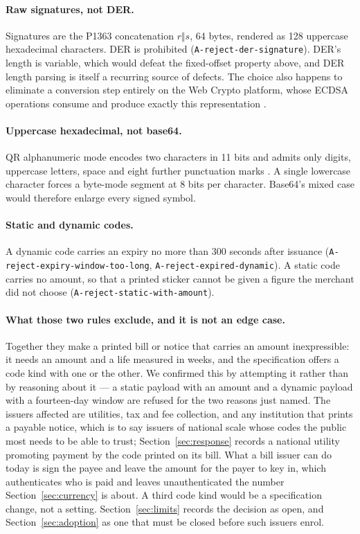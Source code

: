 \documentclass[10pt,a4paper,twocolumn]{article}
\newcommand{\code}[1]{\texttt{\small #1}}
\begin{document}
\paragraph{Raw signatures, not DER.}
Signatures are the P1363 concatenation $r \Vert s$, 64 bytes, rendered as 128
uppercase hexadecimal characters. DER is prohibited (\code{A-reject-\allowbreak der-\allowbreak signature}). DER's length is variable,
which would defeat the fixed-offset property above, and DER length parsing is
itself a recurring source of defects. The choice also happens to eliminate a
conversion step entirely on the Web Crypto platform, whose ECDSA operations
consume and produce exactly this representation \citep{webcrypto,fips1865}.

\paragraph{Uppercase hexadecimal, not base64.}
QR alphanumeric mode encodes two characters in 11 bits and admits only digits,
uppercase letters, space and eight further punctuation marks
\citep{iso18004}. A single lowercase character forces a byte-mode segment at 8
bits per character. Base64's mixed case would therefore enlarge every signed
symbol.

\paragraph{Static and dynamic codes.}
A dynamic code carries an expiry no more than 300 seconds after issuance
(\code{A-reject-\allowbreak expiry-\allowbreak window-\allowbreak too-\allowbreak long},
\code{A-reject-\allowbreak expired-\allowbreak dynamic}). A static code carries no
amount, so that a printed sticker cannot be given a figure the merchant did not
choose (\code{A-reject-\allowbreak static-\allowbreak with-\allowbreak amount}).

\paragraph{What those two rules exclude, and it is not an edge case.}
Together they make a printed bill or notice that carries an amount
inexpressible: it needs an amount and a life measured in weeks, and the
specification offers a code kind with one or the other. We confirmed this by
attempting it rather than by reasoning about it --- a static payload with an
amount and a dynamic payload with a fourteen-day window are refused for the two
reasons just named. The issuers affected are utilities, tax and fee collection,
and any institution that prints a payable notice, which is to say issuers of
national scale whose codes the public most needs to be able to trust;
Section~\ref{sec:response} records a national utility promoting payment by the
code printed on its bill. What a bill issuer can do today is sign the payee and
leave the amount for the payer to key in, which authenticates who is paid and
leaves unauthenticated the number Section~\ref{sec:currency} is about. A third
code kind would be a specification change, not a setting.
Section~\ref{sec:limits} records the decision as open, and
Section~\ref{sec:adoption} as one that must be closed before such issuers
enrol.
\end{document}
